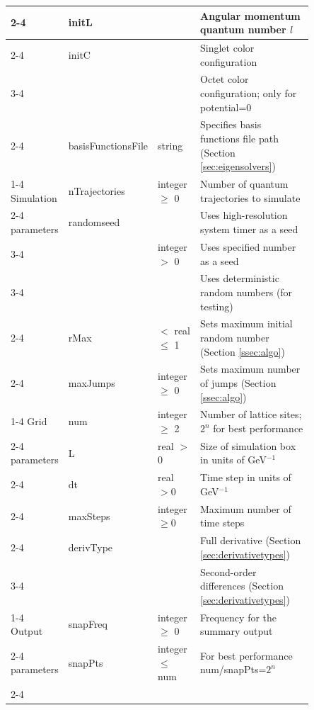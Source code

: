\documentclass[times,sort&compress,final]{elsarticle}
\begin{document}
\begin{table}
\begin{center}
{\begin{tabular}{|p{0.1\linewidth}|p{0.18\linewidth}|p{0.15\linewidth}|p{0.42\linewidth}|}
\cline{2-4}
&\centering initL&\centering 0 &Angular momentum quantum number $l$\\
\cline{2-4}
&\centering initC&\centering 0&Singlet color configuration\\
\cline{3-4}
&&\centering 1&Octet color configuration; only for potential=0\\
\cline{2-4}
&\centering basisFunctionsFile&\centering string& Specifies basis functions file path (Section \ref{sec:eigensolvers}) \\
\cline{1-4}
\centering Simulation&\centering nTrajectories&\centering integer $\geq$ 0 & Number of quantum trajectories to simulate\\
\cline{2-4}
\centering parameters&\centering randomseed&\centering 0& Uses high-resolution system timer as a seed\\
\cline{3-4}
&&\centering integer $>$ 0& Uses specified number as a seed\\
\cline{3-4}
&&\centering -1& Uses deterministic random numbers (for testing)\\
\cline{2-4}
&\centering rMax&\centering 0 $<$ real $\leq$ 1 & Sets maximum initial random number (Section \ref{ssec:algo}) \\
\cline{2-4}
&\centering maxJumps&\centering integer $\ge$ 0 & Sets maximum number of jumps (Section \ref{ssec:algo}) \\
\cline{1-4}
\centering Grid&\centering num&\centering integer $\geq$ 2 & Number of lattice sites; $2^n$ for best performance \\
\cline{2-4}
\centering parameters&\centering L&\centering real $>$ 0&Size of simulation box in units of GeV$^{-1}$\\
\cline{2-4}
&\centering dt&\centering real $> 0$ & Time step in units of GeV$^{-1}$\\
\cline{2-4}
&\centering maxSteps&\centering integer $\geq0$& Maximum number of time steps\\
\cline{2-4}
&\centering derivType&\centering 0&Full derivative  (Section \ref{sec:derivativetypes}) \\
\cline{3-4}
&&\centering 1&Second-order differences  (Section \ref{sec:derivativetypes}) \\
\cline{1-4}
\centering Output&\centering snapFreq&\centering integer $\geq$ 0& Frequency for the summary output\\
\cline{2-4}
\centering parameters&\centering snapPts&\centering integer $\leq$ num& For best performance num/snapPts=$2^n$\\
\cline{2-4}

\end{tabular}}
\end{center}
\end{table}
\end{document}
